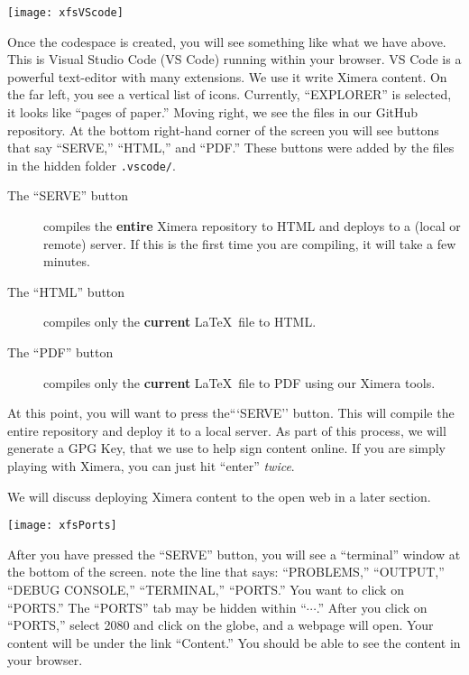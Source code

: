 \documentclass{ximera}
\begin{document}
\begin{image}
    \texttt{[image: xfsVScode]}
\end{image}
        Once the codespace is created, you will see something like what we have
        above. This is Visual Studio Code (VS Code) running within your browser. VS Code
        is a powerful text-editor with many extensions. We use it write Ximera content.
        On the far left, you see a vertical list of icons. Currently, ``EXPLORER'' is
        selected, it looks like ``pages of paper.'' Moving right, we see the files in
        our GitHub repository. At the bottom right-hand corner of the screen you will see
        buttons that say ``SERVE,''  ``HTML,'' and ``PDF.'' These buttons were added by the files
        in the hidden folder \verb!.vscode/!.
        \begin{description}
            \item[The ``SERVE'' button] compiles the \textbf{entire} Ximera repository to HTML and deploys to a (local or remote) server. If this is the first time you are compiling, it will take a few minutes.
        \item[The ``HTML'' button] compiles only the \textbf{current} \LaTeX\ file to HTML.
        \item[The ``PDF'' button] compiles only the \textbf{current} \LaTeX\ file to PDF using our Ximera tools.
        \end{description}
        At this point, you will want to press the```SERVE'' button. This will
        compile the entire repository and deploy it to a local server. As part of this process, 
        we will generate a GPG Key, that we use to help sign content online. 
        If you are simply playing with Ximera, you can just hit ``enter'' \textit{twice}.



        We will discuss deploying Ximera content to the open web in a later section.
        
        \pdfOnly{\end{multicols*}}

\newpage

\begin{image}
    \texttt{[image: xfsPorts]}
\end{image}

    After you have pressed the ``SERVE'' button, you will see a
        ``terminal'' window at the bottom of the screen. 
        note the line that says: ``PROBLEMS,'' ``OUTPUT,'' ``DEBUG CONSOLE,''
        ``TERMINAL,'' ``PORTS.''
        You want
        to click on ``PORTS.'' The ``PORTS'' tab may be hidden within
        ``$\cdots$.''
        After you click on ``PORTS,'' select 2080 and click on the globe, and a
        webpage
        will open. Your
        content will be under the link ``Content.'' You should be able to see
        the
        content in your browser.
\end{document}
